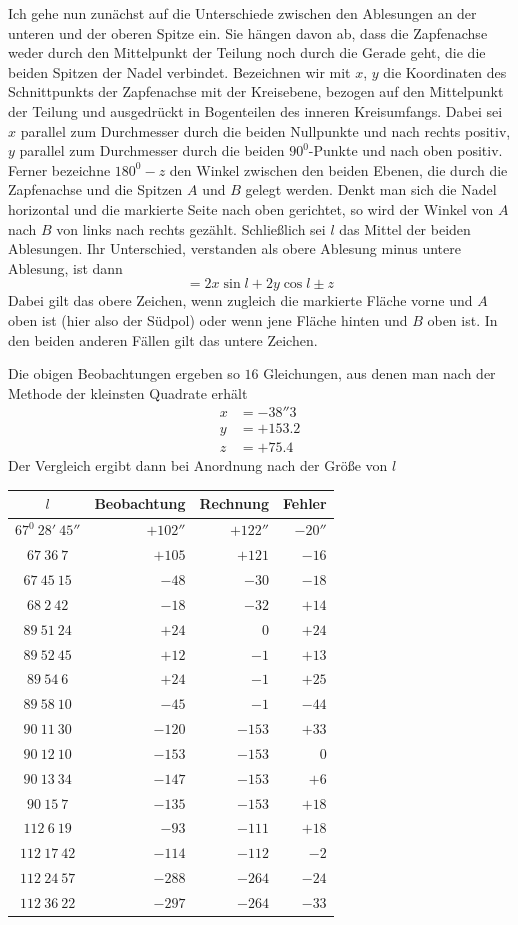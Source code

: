 Ich gehe nun zunächst auf die Unterschiede zwischen den Ablesungen an der unteren und der oberen Spitze ein. Sie hängen davon ab, dass die Zapfenachse weder durch den Mittelpunkt der Teilung noch durch die Gerade geht, die die beiden Spitzen der Nadel verbindet. Bezeichnen wir mit $x$, $y$ die Koordinaten des Schnittpunkts der Zapfenachse mit der Kreisebene, bezogen auf den Mittelpunkt der Teilung und ausgedrückt in Bogenteilen des inneren Kreisumfangs. Dabei sei $x$ parallel zum Durchmesser durch die beiden Nullpunkte und nach rechts positiv, $y$ parallel zum Durchmesser durch die beiden $90^0$-Punkte und nach oben positiv. Ferner bezeichne $180^0-z$ den Winkel zwischen den beiden Ebenen, die durch die Zapfenachse und die Spitzen $A$ und $B$ gelegt werden. Denkt man sich die Nadel horizontal und die markierte Seite nach oben gerichtet, so wird der Winkel von $A$ nach $B$ von links nach rechts gezählt. Schließlich sei $l$ das Mittel der beiden Ablesungen. Ihr Unterschied, verstanden als obere Ablesung minus untere Ablesung, ist dann
\[
=2x\sin l+2y\cos l\pm z
\]
Dabei gilt das obere Zeichen, wenn zugleich die markierte Fläche vorne und $A$ oben ist (hier also der Südpol) oder wenn jene Fläche hinten und $B$ oben ist. In den beiden anderen Fällen gilt das untere Zeichen.

Die obigen Beobachtungen ergeben so $16$ Gleichungen, aus denen man nach der Methode der kleinsten Quadrate erhält
\[
\begin{aligned}
x&=-38''3\\
y&=+153.2\\
z&=+75.4
\end{aligned}
\]
Der Vergleich ergibt dann bei Anordnung nach der Größe von $l$
\begin{center}
{\fontsize{9}{11}\selectfont
\begin{tabular}{c|r|r|r}
$l$&Beobachtung&Rechnung&Fehler\\\hline
$67^0\ 28'\ 45''$&$+102''$&$+122''$&$-20''$\\
$67\ 36\ 7$&$+105$&$+121$&$-16$\\
$67\ 45\ 15$&$-48$&$-30$&$-18$\\
$68\ 2\ 42$&$-18$&$-32$&$+14$\\
$89\ 51\ 24$&$+24$&$0$&$+24$\\
$89\ 52\ 45$&$+12$&$-1$&$+13$\\
$89\ 54\ 6$&$+24$&$-1$&$+25$\\
$89\ 58\ 10$&$-45$&$-1$&$-44$\\
$90\ 11\ 30$&$-120$&$-153$&$+33$\\
$90\ 12\ 10$&$-153$&$-153$&$0$\\
$90\ 13\ 34$&$-147$&$-153$&$+6$\\
$90\ 15\ 7$&$-135$&$-153$&$+18$\\
$112\ 6\ 19$&$-93$&$-111$&$+18$\\
$112\ 17\ 42$&$-114$&$-112$&$-2$\\
$112\ 24\ 57$&$-288$&$-264$&$-24$\\
$112\ 36\ 22$&$-297$&$-264$&$-33$
\end{tabular}}
\end{center}

